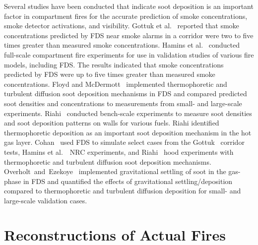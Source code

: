 Several studies have been conducted that indicate soot deposition is an important factor in compartment fires
for the accurate prediction of smoke concentrations, smoke detector activations, and visibility.
Gottuk et al.~\cite{Gottuk:IAFSS2008} reported that smoke concentrations predicted by FDS near smoke alarms in a
corridor were two to five times greater than measured smoke concentrations. Hamins et al.~\cite{Hamins:SP1013-1}
conducted full-scale compartment fire experiments for use in validation studies of various fire models, including FDS.
The results indicated that smoke concentrations predicted by FDS were up to five times greater than measured
smoke concentrations. Floyd and McDermott~\cite{Floyd:Interflam2010} implemented thermophoretic and turbulent diffusion soot
deposition mechanisms in FDS and compared predicted soot densities and concentrations to measurements from small- and large-scale
experiments. Riahi~\cite{Riahi:2011} conducted bench-scale experiments to measure soot densities and soot
deposition patterns on walls for various fuels. Riahi identified thermophoretic deposition as an important soot deposition
mechanism in the hot gas layer. Cohan~\cite{Cohan:Masters} used FDS to simulate select cases from the
Gottuk~\cite{Gottuk:IAFSS2008} corridor tests, Hamins et al.~\cite{Hamins:SP1013-1}~NRC experiments, and
Riahi~\cite{Riahi:2011} hood experiments with thermophoretic and turbulent diffusion soot deposition mechanisms.
Overholt~and~Ezekoye~\cite{Overholt:1} implemented gravitational settling of soot in the gas-phase in FDS and quantified
the effects of gravitational settling/deposition compared to thermophoretic and turbulent diffusion deposition for small- and
large-scale validation cases.




\section{Reconstructions of Actual Fires}

